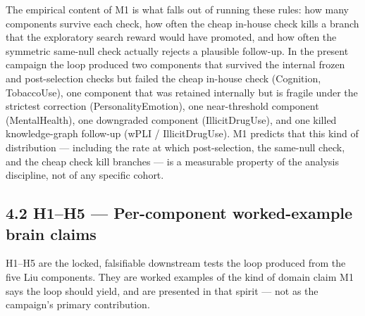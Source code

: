 \documentclass[11pt,letterpaper]{report}
\begin{document}
The empirical content of M1 is what falls out of running these rules: how many components survive each check, how often the cheap in-house check kills a branch that the exploratory search reward would have promoted, and how often the symmetric same-null check actually rejects a plausible follow-up. In the present campaign the loop produced two components that survived the internal frozen and post-selection checks but failed the cheap in-house check (Cognition, TobaccoUse), one component that was retained internally but is fragile under the strictest correction (PersonalityEmotion), one near-threshold component (MentalHealth), one downgraded component (IllicitDrugUse), and one killed knowledge-graph follow-up (wPLI / IllicitDrugUse). M1 predicts that this kind of distribution --- including the rate at which post-selection, the same-null check, and the cheap check kill branches --- is a measurable property of the analysis discipline, not of any specific cohort.

\subsection*{4.2 H1--H5 --- Per-component worked-example brain claims}

H1--H5 are the locked, falsifiable downstream tests the loop produced from the five Liu components. They are worked examples of the kind of domain claim M1 says the loop should yield, and are presented in that spirit --- not as the campaign's primary contribution.
\end{document}
